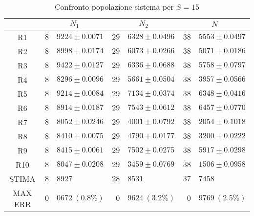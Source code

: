 \begin{table}[!h]
\begin{tabular}{c|r@{.}l|r@{.}l|r@{.}l}
& \multicolumn{2}{|c|}{$N_1$}
& \multicolumn{2}{|c|}{$N_2$}
& \multicolumn{2}{|c}{$N$} 
\\          
\hline
R1      & $8$&$9224 \pm 0.0071$ & $29$&$6328 \pm 0.0496$ & $38$&$5553 \pm 0.0497$ \\
R2      & $8$&$8998 \pm 0.0174$ & $29$&$6073 \pm 0.0266$ & $38$&$5071 \pm 0.0186$ \\
R3      & $8$&$9422 \pm 0.0127$ & $29$&$6336 \pm 0.0688$ & $38$&$5758 \pm 0.0797$ \\
R4      & $8$&$8296 \pm 0.0096$ & $29$&$5661 \pm 0.0504$ & $38$&$3957 \pm 0.0566$ \\
R5      & $8$&$9214 \pm 0.0084$ & $29$&$7134 \pm 0.0374$ & $38$&$6348 \pm 0.0416$ \\
R6      & $8$&$8914 \pm 0.0187$ & $29$&$7543 \pm 0.0612$ & $38$&$6457 \pm 0.0770$ \\
R7      & $8$&$8052 \pm 0.0246$ & $29$&$4001 \pm 0.0792$ & $38$&$2054 \pm 0.1018$ \\
R8      & $8$&$8410 \pm 0.0075$ & $29$&$4790 \pm 0.0177$ & $38$&$3200 \pm 0.0222$ \\
R9      & $8$&$8415 \pm 0.0061$ & $29$&$7502 \pm 0.0275$ & $38$&$5917 \pm 0.0298$ \\
R10     & $8$&$8047 \pm 0.0208$ & $29$&$3459 \pm 0.0769$ & $38$&$1506 \pm 0.0958$ \\
STIMA   & $8$&$8927$            & $28$&$8531$            & $37$&$7458$            \\
MAX ERR & $0$&$0672 \ (0.8\%)$  & $0$&$9624 \ (3.2\%)$   & $0$&$9769 \ (2.5\%)$       
\end{tabular}
\centering
\caption{Confronto popolazione sistema per $S=15$}
\label{tab:15_n}
\end{table}
